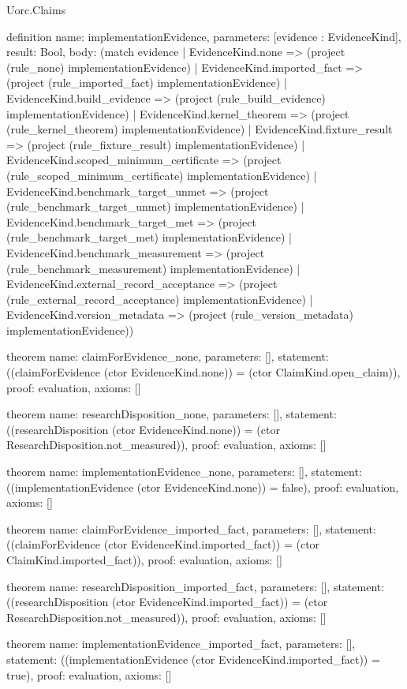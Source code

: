 \begin{lexlean}{Uorc.Claims}
\begin{semanticmodule}
definition{
  name: implementationEvidence,
  parameters: [evidence : EvidenceKind],
  result: Bool,
  body: (match evidence
    | EvidenceKind.none => (project (rule_none) implementationEvidence)
    | EvidenceKind.imported_fact => (project (rule_imported_fact) implementationEvidence)
    | EvidenceKind.build_evidence => (project (rule_build_evidence) implementationEvidence)
    | EvidenceKind.kernel_theorem => (project (rule_kernel_theorem) implementationEvidence)
    | EvidenceKind.fixture_result => (project (rule_fixture_result) implementationEvidence)
    | EvidenceKind.scoped_minimum_certificate => (project (rule_scoped_minimum_certificate) implementationEvidence)
    | EvidenceKind.benchmark_target_unmet => (project (rule_benchmark_target_unmet) implementationEvidence)
    | EvidenceKind.benchmark_target_met => (project (rule_benchmark_target_met) implementationEvidence)
    | EvidenceKind.benchmark_measurement => (project (rule_benchmark_measurement) implementationEvidence)
    | EvidenceKind.external_record_acceptance => (project (rule_external_record_acceptance) implementationEvidence)
    | EvidenceKind.version_metadata => (project (rule_version_metadata) implementationEvidence))
}

theorem{
  name: claimForEvidence_none,
  parameters: [],
  statement: ((claimForEvidence (ctor EvidenceKind.none)) = (ctor ClaimKind.open_claim)),
  proof: evaluation{},
  axioms: []
}

theorem{
  name: researchDisposition_none,
  parameters: [],
  statement: ((researchDisposition (ctor EvidenceKind.none)) = (ctor ResearchDisposition.not_measured)),
  proof: evaluation{},
  axioms: []
}

theorem{
  name: implementationEvidence_none,
  parameters: [],
  statement: ((implementationEvidence (ctor EvidenceKind.none)) = false),
  proof: evaluation{},
  axioms: []
}

theorem{
  name: claimForEvidence_imported_fact,
  parameters: [],
  statement: ((claimForEvidence (ctor EvidenceKind.imported_fact)) = (ctor ClaimKind.imported_fact)),
  proof: evaluation{},
  axioms: []
}

theorem{
  name: researchDisposition_imported_fact,
  parameters: [],
  statement: ((researchDisposition (ctor EvidenceKind.imported_fact)) = (ctor ResearchDisposition.not_measured)),
  proof: evaluation{},
  axioms: []
}

theorem{
  name: implementationEvidence_imported_fact,
  parameters: [],
  statement: ((implementationEvidence (ctor EvidenceKind.imported_fact)) = true),
  proof: evaluation{},
  axioms: []
}


\end{semanticmodule}
\end{lexlean}
